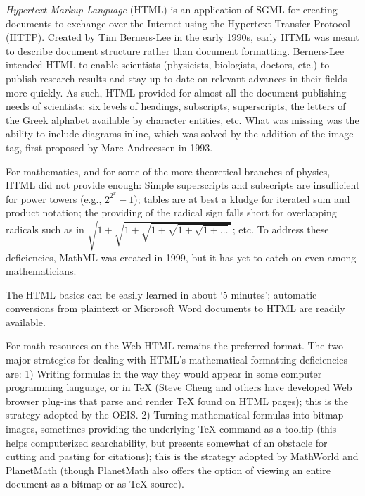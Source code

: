 \documentclass[12pt]{article}
\begin{document}
{\em Hypertext Markup Language} (HTML) is an application of SGML for creating documents to exchange over the Internet using the Hypertext Transfer Protocol (HTTP). Created by Tim Berners-Lee in the early 1990s, early HTML was meant to describe document structure rather than document formatting. Berners-Lee intended HTML to enable scientists (physicists, biologists, doctors, etc.) to publish research results and stay up to date on relevant advances in their fields more quickly. As such, HTML provided for almost all the document publishing needs of scientists: six levels of headings, subscripts, superscripts, the letters of the Greek alphabet available by character entities, etc. What was missing was the ability to include diagrams inline, which was solved by the addition of the image tag, first proposed by Marc Andreessen in 1993.

For mathematics, and for some of the more theoretical branches of physics, HTML did not provide enough: Simple superscripts and subscripts are insufficient for power towers (e.g., $2^{2^x} - 1$); tables are at best a kludge for iterated sum and product notation; the providing of the radical sign falls short for overlapping radicals such as in $\sqrt{1 + \sqrt{1 + \sqrt{1 + \sqrt{1 + \sqrt{1 + \ldots}}}}}$; etc. To address these deficiencies, MathML was created in 1999, but it has yet to catch on even among mathematicians.

The HTML basics can be easily learned in about `5 minutes'; automatic conversions from plaintext or Microsoft Word documents to HTML are readily available.

For math resources on the Web HTML remains the preferred format. The two major strategies for dealing with HTML's mathematical formatting deficiencies are: 1) Writing formulas in the way they would appear in some computer programming language, or in \TeX{} (Steve Cheng and others have developed Web browser plug-ins that parse and render \TeX{} found on HTML pages); this is the strategy adopted by the OEIS. 2) Turning mathematical formulas into bitmap images, sometimes providing the underlying \TeX{} command as a tooltip (this helps computerized searchability, but presents somewhat of an obstacle for cutting and pasting for citations); this is the strategy adopted by MathWorld and PlanetMath (though PlanetMath also offers the option of viewing an entire document as a bitmap or as \TeX{} source).

\end{document}
